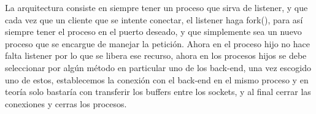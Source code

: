 La arquitectura consiste en siempre tener un proceso que sirva de listener, y que cada vez que un cliente que se intente conectar, el listener haga fork(),
para así siempre tener el proceso en el puerto deseado, y que simplemente sea un nuevo proceso que se encargue de manejar la petición. Ahora en el
proceso hijo no hace falta listener por lo que se libera ese recurso, ahora en los procesos hijos se debe seleccionar por algún método en particular uno
de los back-end, una vez escogido uno de estos, establecemos la conexión con el back-end en el mismo proceso y en teoría solo bastaría con transferir
los buffers entre los sockets, y al final cerrar las conexiones y cerras los procesos.\\

